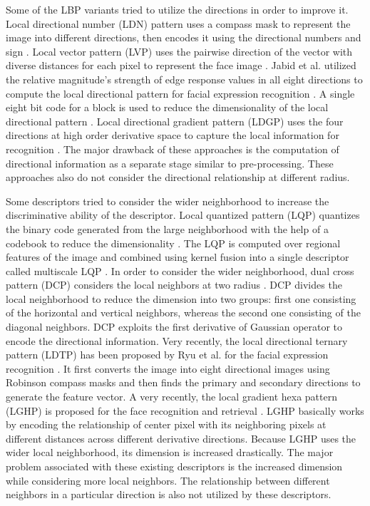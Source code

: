 \documentclass[a4paper]{article}
\begin{document}
Some of the LBP variants tried to utilize the directions in order to improve it. Local directional number (LDN) pattern uses a compass mask to represent the image into different directions, then encodes it using the directional numbers and sign \cite{ldn}. Local vector pattern (LVP) uses the pairwise direction of the vector with diverse distances for each pixel to represent the face image \cite{lvp}. Jabid et al. utilized the relative magnitude's strength of edge response values in all eight directions to compute the local directional pattern for facial expression recognition \cite{jabid2010facial}. A single eight bit code for a block is used to reduce the dimensionality of the local directional pattern \cite{drldp}. Local directional gradient pattern (LDGP) uses the four directions at high order derivative space to capture the local information for recognition \cite{ldgp}. The major drawback of these approaches is the computation of directional information as a separate stage similar to pre-processing. These approaches also do not consider the directional relationship at different radius. 

Some descriptors tried to consider the wider neighborhood to increase the discriminative ability of the descriptor.
Local quantized pattern (LQP) quantizes the binary code generated from the large neighborhood with the help of a codebook to reduce the dimensionality \cite{lqp}. The LQP is computed over regional features of the image and combined using kernel fusion into a single descriptor called multiscale LQP \cite{chan2013}. In order to consider the wider neighborhood, dual cross pattern (DCP) considers the local neighbors at two radius \cite{dcp}. DCP divides the local neighborhood to reduce the dimension into two groups: first one consisting of the horizontal and vertical neighbors, whereas the second one consisting of the diagonal neighbors. DCP exploits the first derivative of Gaussian operator to encode the directional information. Very recently, the local directional ternary pattern (LDTP) has been proposed by Ryu et al. for the facial expression recognition \cite{ldtp}. It first converts the image into eight directional images using Robinson compass masks and then finds the primary and secondary directions to generate the feature vector. A very recently, the local gradient hexa pattern (LGHP) is proposed for the face recognition and retrieval \cite{lghp}. LGHP basically works by encoding the relationship of center pixel with its neighboring pixels at different distances across different derivative directions. Because LGHP uses the wider local neighborhood, its dimension is increased drastically. The major problem associated with these existing descriptors is the increased dimension while considering more local neighbors. The relationship between different neighbors in a particular direction is also not utilized by these descriptors. 
\end{document}
